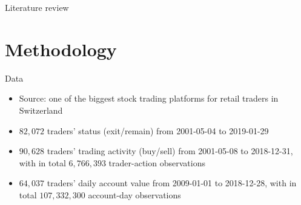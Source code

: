 \documentclass{beamer}
\begin{document}
\begin{frame}{Literature review}
\begin{itemize}
	\end{itemize}
	
\end{frame}


\section{Methodology}

\begin{frame}{Data}
	
\begin{itemize}
	\item Source: one of the biggest stock trading platforms for retail traders in Switzerland
	\item $82,072$ traders' status (exit/remain) from 2001-05-04 to 2019-01-29
	\item $90,628$ traders' trading activity (buy/sell) from 2001-05-08 to 2018-12-31,
	with in total $6,766,393$ trader-action observations
	\item $64,037$ traders' daily account value from 2009-01-01 to 2018-12-28, 
	with in total $107,332,300$ account-day observations
\end{itemize}
	
\end{frame}
\end{document}

